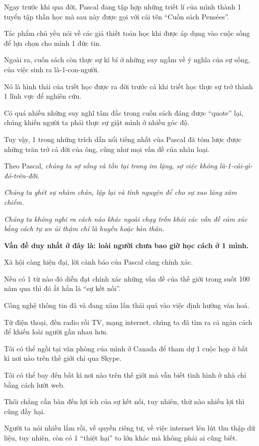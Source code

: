 \documentclass{article}
\begin{document}
%
Ngay trước khi qua đời, Pascal đang tập hợp những triết lí của mình thành 1 tuyển tập thần học mà sau này được gọi với cái tên ``Cuốn sách Pensées''.

Tác phẩm chủ yếu nói về các giả thiết toán học khi được áp dụng vào cuộc sống để lựa chọn cho mình 1 đức tin.

Ngoài ra, cuốn sách còn thực sự kì bí ở những suy ngẫm về ý nghĩa của sự sống, của việc sinh ra là-1-con-người.

Nó là hình thái của triết học được ra đời trước cả khi triết học thực sự trở thành 1 lĩnh vực để nghiên cứu.

%
Có quá nhiều những suy nghĩ tâm đắc trong cuốn sách đáng được ``quote'' lại, chúng khiến người ta phải thực sự giật mình ở nhiều góc độ.

Tuy vậy, 1 trong những trích dẫn nổi tiếng nhất của Pascal đã tóm lược được những trăn trở cả đời của ông, cũng như mọi vấn đề của nhân loại.

%
Theo Pascal, \textit{chúng ta sợ sống và tồn tại trong im lặng, sợ việc không là-1-cái-gì-đó-trên-đời.}

\textit{Chúng ta ghét sự nhàm chán, lặp lại và tình nguyện để cho sự xao lãng xâm chiếm.}

\textit{Chúng ta không nghĩ ra cách nào khác ngoài chạy trốn khỏi các vấn đề cảm xúc bằng cách tự an ủi thậm chí là huyễn hoặc bản thân}.

%
\textbf{Vấn đề duy nhất ở đây là: loài người chưa bao giờ học cách ở 1 mình.}

%
Xã hội càng hiện đại, lời cảnh báo của Pascal càng chính xác.

Nếu có 1 từ nào đó diễn đạt chính xác những vấn đề của thế giới trong suốt 100 năm qua thì đó ắt hẳn là ``sự kết nối''.

%
Công nghệ thông tin đã và đang xâm lấn thái quá vào việc định hướng văn hoá.

Từ điện thoại, đến radio rồi TV, mạng internet, chúng ta đã tìm ra cả ngàn cách để khiến loài người gần nhau hơn.

Tôi có thể ngồi tại văn phòng của mình ở Canada để tham dự 1 cuộc họp ở bất kì nơi nào trên thế giới chỉ qua Skype.

Tôi có thể bay đến bất kì nơi nào trên thế giới mà vẫn biết tình hình ở nhà chỉ bằng cách lướt web.

Thôi chẳng cần bàn đến lợi ích của sự kết nối, tuy nhiên, thứ nào nhiều lợi thì cũng đầy hại.

Người ta nói nhiều lắm rồi, về quyền riêng tư, về việc internet lén lút thu thập dữ liệu, tuy nhiên, còn có 1 ``thiệt hại'' to lớn khác mà không phải ai cũng biết.
\end{document}
